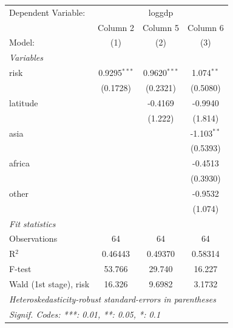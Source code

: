 
\begingroup
\centering
\begin{tabular}{lccc}
   \tabularnewline \midrule \midrule
   Dependent Variable: & \multicolumn{3}{c}{loggdp}\\
                          & Column 2       & Column 5       & Column 6 \\   
   Model:                 & (1)            & (2)            & (3)\\  
   \midrule
   \emph{Variables}\\
   risk                   & 0.9295$^{***}$ & 0.9620$^{***}$ & 1.074$^{**}$\\   
                          & (0.1728)       & (0.2321)       & (0.5080)\\   
   latitude               &                & -0.4169        & -0.9940\\   
                          &                & (1.222)        & (1.814)\\   
   asia                   &                &                & -1.103$^{**}$\\   
                          &                &                & (0.5393)\\   
   africa                 &                &                & -0.4513\\   
                          &                &                & (0.3930)\\   
   other                  &                &                & -0.9532\\   
                          &                &                & (1.074)\\   
   \midrule
   \emph{Fit statistics}\\
   Observations           & 64             & 64             & 64\\  
   R$^2$                  & 0.46443        & 0.49370        & 0.58314\\  
   F-test                 & 53.766         & 29.740         & 16.227\\  
   Wald (1st stage), risk & 16.326         & 9.6982         & 3.1732\\  
   \midrule \midrule
   \multicolumn{4}{l}{\emph{Heteroskedasticity-robust standard-errors in parentheses}}\\
   \multicolumn{4}{l}{\emph{Signif. Codes: ***: 0.01, **: 0.05, *: 0.1}}\\
\end{tabular}
\par\endgroup


